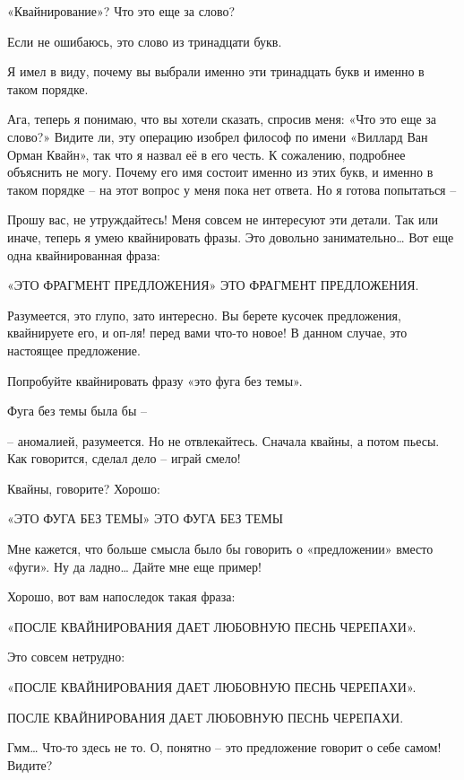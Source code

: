 \documentclass[../main.tex]{subfiles}
\begin{document}
\begin{Dialogue}
 «Квайнирование»? Что это еще за слово?

 Если не ошибаюсь, это слово из тринадцати букв.

 Я имел в виду, почему вы выбрали именно эти тринадцать букв и именно в таком порядке.

 Ага, теперь я понимаю, что вы хотели сказать, спросив меня: «Что это еще за слово?» Видите ли, эту операцию изобрел философ по имени «Виллард Ван Орман Квайн», так что я назвал её в его честь. К сожалению, подробнее объяснить не могу. Почему его имя состоит именно из этих букв, и именно в таком порядке \--- на этот вопрос у меня пока нет ответа. Но я готова попытаться \---

 Прошу вас, не утруждайтесь! Меня совсем не интересуют эти детали. Так или иначе, теперь я умею квайнировать фразы. Это довольно занимательно\ldots{} Вот еще одна квайнированная фраза:

«ЭТО ФРАГМЕНТ ПРЕДЛОЖЕНИЯ» ЭТО ФРАГМЕНТ ПРЕДЛОЖЕНИЯ.

Разумеется, это глупо, зато интересно. Вы берете кусочек предложения, квайнируете его, и оп-ля! перед вами что-то новое! В данном случае, это настоящее предложение.

 Попробуйте квайнировать фразу «это фуга без темы».

 Фуга без темы была бы \---

 \--- аномалией, разумеется. Но не отвлекайтесь. Сначала квайны, а потом пьесы. Как говорится, сделал дело \--- играй смело!

 Квайны, говорите? Хорошо:

«ЭТО ФУГА БЕЗ ТЕМЫ» ЭТО ФУГА БЕЗ ТЕМЫ

Мне кажется, что больше смысла было бы говорить о «предложении» вместо «фуги». Ну да ладно\ldots{} Дайте мне еще пример!

 Хорошо, вот вам напоследок такая фраза:

«ПОСЛЕ КВАЙНИРОВАНИЯ ДАЕТ ЛЮБОВНУЮ ПЕСНЬ ЧЕРЕПАХИ».

 Это совсем нетрудно:

«ПОСЛЕ КВАЙНИРОВАНИЯ ДАЕТ ЛЮБОВНУЮ ПЕСНЬ ЧЕРЕПАХИ».

ПОСЛЕ КВАЙНИРОВАНИЯ ДАЕТ ЛЮБОВНУЮ ПЕСНЬ ЧЕРЕПАХИ.

Гмм\ldots{} Что-то здесь не то. О, понятно \--- это предложение говорит о себе самом! Видите?


\end{Dialogue}
\end{document}
